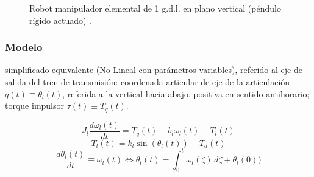\documentclass[a4paper, 10pt, onecolumn,journal]{ieeeconf}
\begin{document}
\begin{figure}[thpb]
    \centering
    \begin{adjustbox}{max width=0.5\columnwidth}
    \end{adjustbox}
    \caption{Robot manipulador elemental de 1 g.d.l. en plano vertical (péndulo rígido actuado) \cite{c2}.}
    \label{brazo}
\end{figure}
\bigskip


\subsubsection{\textbf{Modelo}} simplificado equivalente (No Lineal con parámetros variables), referido al eje de salida del tren de transmisión: coordenada articular de eje de la articulación $q(t) \equiv \theta_l(t)$, referida a la vertical hacia abajo, positiva en sentido antihorario; torque impulsor $\tau(t) \equiv T_q(t)$.

\begin{equation}
    J_l \frac{d\omega_l(t)}{dt} = T_q(t) - b_l \omega_l(t) - T_l(t)
    \label{subsistema mecánico referido a eje de salida}
\end{equation}
\begin{equation}
    T_l(t) = k_l \sin(\theta_l(t)) + T_d(t)
    \label{torque de carga}
\end{equation}
\begin{equation}
    \frac{d\theta_l(t)}{dt} \equiv \omega_l(t) \Leftrightarrow \theta_l(t) = \int_{0}^{t} \omega_l(\zeta) \, d\zeta + \theta_l(0))
    \label{velocidad y posición de la carga}
\end{equation}
\end{document}
